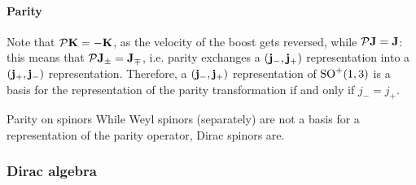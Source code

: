
\paragraph{Parity}

Note that $ \mathcal{P} \mathbf{K} = -\mathbf{K} $, as the velocity of the boost gets reversed, while $ \mathcal{P} \mathbf{J} = \mathbf{J} $: this means that $ \mathcal{P} \mathbf{J}_\pm = \mathbf{J}_\mp $, i.e. parity exchanges a $ \mathbf{\left( j_-,j_+ \right)} $ representation into a $ \mathbf{\left( j_+,j_- \right)} $ representation. Therefore, a $ \mathbf{\left( j_-,j_+ \right)} $ representation of $ \mathrm{SO}^+(1,3) $ is a basis for the representation of the parity transformation if and only if $ j_- = j_+ $.

\begin{example}{Parity on spinors}{}
  While Weyl spinors (separately) are not a basis for a representation of the parity operator, Dirac spinors are.
\end{example}

\subsubsection{Dirac algebra}

